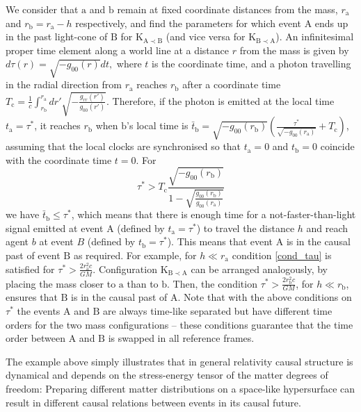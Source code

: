 \documentclass[a4paper,11pt]{article}
\def\go{g_\mathrm{00}}
\newcommand{\be}{\begin{equation}}
\newcommand{\ee}[1]{\label{#1} \end{equation}}
\begin{document}
We consider that $\mathrm a$ and $\mathrm b$ remain at fixed coordinate distances from the mass, $r_\mathrm{a}$ and $r_\mathrm{b}  = r_\mathrm{a} - h$ respectively, and find the parameters for which event $\mathrm A$ ends up in the past light-cone of $\mathrm B$ for $\mathrm{K_{A\prec B}}$ (and vice versa for  $\mathrm{K_{B\prec A}}$). An infinitesimal proper time element along a world line at a distance $r$ from the mass is given by $d\tau(r)=\sqrt{-\go(r)}dt,$ where $t$ is the coordinate time, and a photon travelling in the radial direction from $r_\mathrm{a}$ reaches $r_\mathrm{b}$ after a coordinate time $T_\mathrm{c}=\frac{1}{c}\int_{r_\mathrm{b}}^{r_\mathrm{a}}dr'\sqrt{-\frac{g_{rr}(r')}{\go(r')}}$. Therefore, if the photon is emitted at the local time $t_\mathrm{a}=\tau^*$, it reaches $r_\mathrm{b}$ when $\mathrm b$'s local time is $\bar t_\mathrm{b}=\sqrt{-g_\mathrm{00}(r_\mathrm{b})}(\frac{\tau^*}{\sqrt{-\go(r_\mathrm{a})}}+T_\mathrm{c})$, assuming that the local clocks are synchronised so that $t_\mathrm{a}=0$ and $t_\mathrm{b}=0$ coincide with the coordinate time $t=0$. For
%
\be
\tau^*>T_\mathrm{c}\frac{\sqrt{-\go(r_\mathrm{b})}}{1-\sqrt{\frac{\go(r_\mathrm{b})}{\go(r_\mathrm{a})}}}
\ee{cond_tau}
%
we have $\bar t_\mathrm{b}\leq\tau^*$, which means that there is enough time for a not-faster-than-light signal emitted at event $\mathrm A$ (defined by $t_\mathrm{a}=\tau^*$) to travel the distance $h$ and reach agent $ b$ at event $ B$ (defined by $t_\mathrm{b}=\tau^*$). This means that event $\mathrm A$  is in the causal past of event $\mathrm B$ as required. For example, for $h\ll r_\mathrm{a}$ condition \eqref{cond_tau} is satisfied for  $\tau^*>\frac{2r_\mathrm{a}^2 c}{GM}$.  Configuration $\mathrm{K_\mathrm{B\prec A}}$ can be arranged  analogously, by placing the mass closer to $\mathrm a$ than to $\mathrm b$. Then, the condition $\tau^*>\frac{2r_\mathrm{b}^2 c}{GM}$, for $h\ll r_\mathrm{b}$, ensures that $\mathrm B$ is in the causal past of $\mathrm A$. Note that with the above conditions on $\tau^*$ the events $\mathrm A$ and $\mathrm B$ are always time-like separated but have different time orders for the two mass configurations -- these conditions guarantee that the time order between $\mathrm A$ and $\mathrm B$ is swapped in all reference frames.

The example above simply illustrates that in general relativity causal structure is dynamical and depends on the stress-energy tensor of the matter degrees of freedom: Preparing different matter distributions on a space-like hypersurface can result in different causal relations between events in its causal future.
\end{document}
